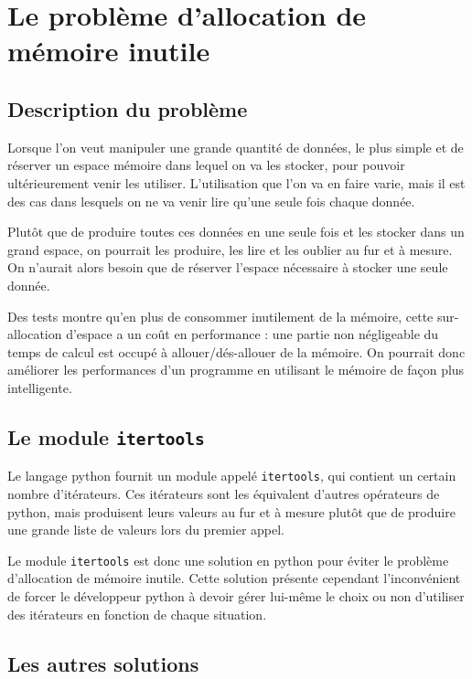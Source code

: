 \documentclass[a4paper]{article}
\begin{document}
\section*{Le problème d'allocation de mémoire inutile}

\subsection*{Description du problème}

Lorsque l'on veut manipuler une grande quantité de données, le plus
simple et de réserver un espace mémoire dans lequel on va les stocker,
pour pouvoir ultérieurement venir les utiliser. L'utilisation que l'on
va en faire varie, mais il est des cas dans lesquels on ne va venir
lire qu'une seule fois chaque donnée.

Plutôt que de produire toutes ces données en une seule fois et les
stocker dans un grand espace, on pourrait les produire, les lire et
les oublier au fur et à mesure. On n'aurait alors besoin que de
réserver l'espace nécessaire à stocker une seule donnée.

Des tests montre qu'en plus de consommer inutilement de la mémoire,
cette sur-allocation d'espace a un coût en performance : une partie
non négligeable du temps de calcul est occupé à allouer/dés-allouer de
la mémoire. On pourrait donc améliorer les performances d'un programme
en utilisant le mémoire de façon plus intelligente.

\subsection*{Le module \texttt{itertools}}

Le langage python fournit un module appelé \texttt{itertools}, qui
contient un certain nombre d'itérateurs. Ces itérateurs sont les
équivalent d'autres opérateurs de python, mais produisent leurs
valeurs au fur et à mesure plutôt que de produire une grande liste de
valeurs lors du premier appel.

Le module \texttt{itertools} est donc une solution en python pour éviter le
problème d'allocation de mémoire inutile. Cette solution présente
cependant l'inconvénient de forcer le développeur python à devoir
gérer lui-même le choix ou non d'utiliser des itérateurs en fonction
de chaque situation. 

\subsection*{Les autres solutions }
\end{document}

